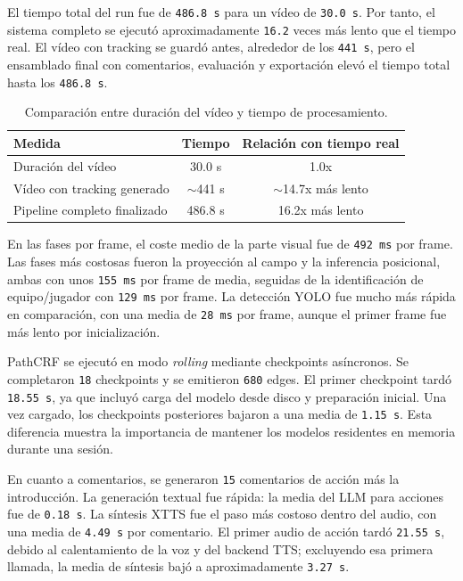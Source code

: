 El tiempo total del run fue de \texttt{486.8 s} para un vídeo de \texttt{30.0 s}. Por tanto, el sistema completo se ejecutó aproximadamente \texttt{16.2} veces más lento que el tiempo real. El vídeo con tracking se guardó antes, alrededor de los \texttt{441 s}, pero el ensamblado final con comentarios, evaluación y exportación elevó el tiempo total hasta los \texttt{486.8 s}.

\begin{table}[ht]
\centering
\small
\begin{tabular}{lcc}
\toprule
Medida & Tiempo & Relación con tiempo real \\
\midrule
Duración del vídeo & 30.0 s & 1.0x \\
Vídeo con tracking generado & $\sim$441 s & $\sim$14.7x más lento \\
Pipeline completo finalizado & 486.8 s & 16.2x más lento \\
\bottomrule
\end{tabular}
\caption{Comparación entre duración del vídeo y tiempo de procesamiento.}
\end{table}

En las fases por frame, el coste medio de la parte visual fue de \texttt{492 ms} por frame. Las fases más costosas fueron la proyección al campo y la inferencia posicional, ambas con unos \texttt{155 ms} por frame de media, seguidas de la identificación de equipo/jugador con \texttt{129 ms} por frame. La detección YOLO fue mucho más rápida en comparación, con una media de \texttt{28 ms} por frame, aunque el primer frame fue más lento por inicialización.

PathCRF se ejecutó en modo \textit{rolling} mediante checkpoints asíncronos. Se completaron \texttt{18} checkpoints y se emitieron \texttt{680} edges. El primer checkpoint tardó \texttt{18.55 s}, ya que incluyó carga del modelo desde disco y preparación inicial. Una vez cargado, los checkpoints posteriores bajaron a una media de \texttt{1.15 s}. Esta diferencia muestra la importancia de mantener los modelos residentes en memoria durante una sesión.

En cuanto a comentarios, se generaron \texttt{15} comentarios de acción más la introducción. La generación textual fue rápida: la media del LLM para acciones fue de \texttt{0.18 s}. La síntesis XTTS fue el paso más costoso dentro del audio, con una media de \texttt{4.49 s} por comentario. El primer audio de acción tardó \texttt{21.55 s}, debido al calentamiento de la voz y del backend TTS; excluyendo esa primera llamada, la media de síntesis bajó a aproximadamente \texttt{3.27 s}.

